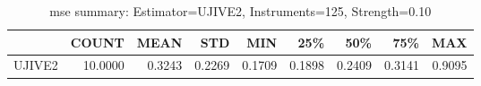 \begin{table}[ht]
\centering
\caption{mse summary: Estimator=UJIVE2, Instruments=125, Strength=0.10}
\begin{tabular}{lrrrrrrrr}
\toprule
 & COUNT & MEAN & STD & MIN & 25\% & 50\% & 75\% & MAX \\
\midrule
UJIVE2 & 10.0000 & 0.3243 & 0.2269 & 0.1709 & 0.1898 & 0.2409 & 0.3141 & 0.9095 \\
\bottomrule
\end{tabular}
\end{table}
